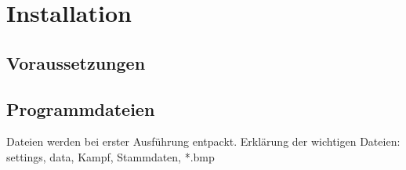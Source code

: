 \chapter{Installation}

\section{Voraussetzungen}

\section{Programmdateien}

Dateien werden bei erster Ausführung entpackt. 
Erklärung der wichtigen Dateien: settings, data, Kampf, Stammdaten, *.bmp